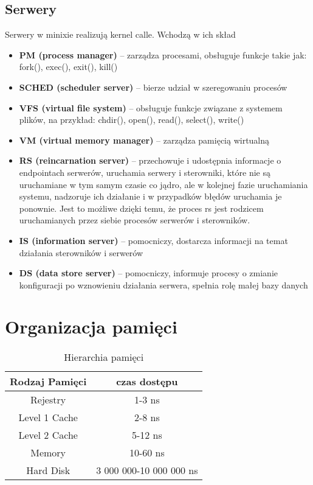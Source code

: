 \subsection{Serwery}
Serwery w minixie realizują kernel calle. Wchodzą w ich skład
\begin{itemize}
	\item \textbf{PM (process manager)} – zarządza procesami, obsługuje funkcje takie jak: fork(), exec(), exit(), kill()
	\item \textbf{SCHED (scheduler server)} – bierze udział w szeregowaniu procesów
	\item \textbf{VFS (virtual file system)} – obsługuje funkcje związane z systemem plików, na przykład: chdir(), open(), read(), select(), write()
	\item \textbf{VM (virtual memory manager)} – zarządza pamięcią wirtualną
	\item \textbf{RS (reincarnation server)} – przechowuje i udostępnia informacje o endpointach serwerów, uruchamia serwery i sterowniki, które nie są uruchamiane w tym samym czasie co jądro, ale w kolejnej fazie uruchamiania systemu, nadzoruje ich działanie i w przypadków błędów uruchamia je ponownie. Jest to możliwe dzięki temu, że proces rs jest rodzicem uruchamianych przez siebie procesów serwerów i sterowników.
	\item \textbf{IS (information server)} – pomocniczy, dostarcza informacji na temat działania sterowników i serwerów
	\item \textbf{DS (data store server)} – pomocniczy, informuje procesy o zmianie konfiguracji po wznowieniu działania serwera, spełnia rolę małej bazy danych
\end{itemize}

\section{Organizacja pamięci}
\begin{table}[H]
	\centering
	\begin{tabular}{c|c}
		Rodzaj Pamięci & czas dostępu            \\
		\hline
		Rejestry       & 1-3 ns                  \\
		Level 1 Cache  & 2-8 ns                  \\
		Level 2 Cache  & 5-12 ns                 \\
		Memory         & 10-60 ns                \\
		Hard Disk      & 3 000 000-10 000 000 ns
	\end{tabular}
	\caption{Hierarchia pamięci}
\end{table}
